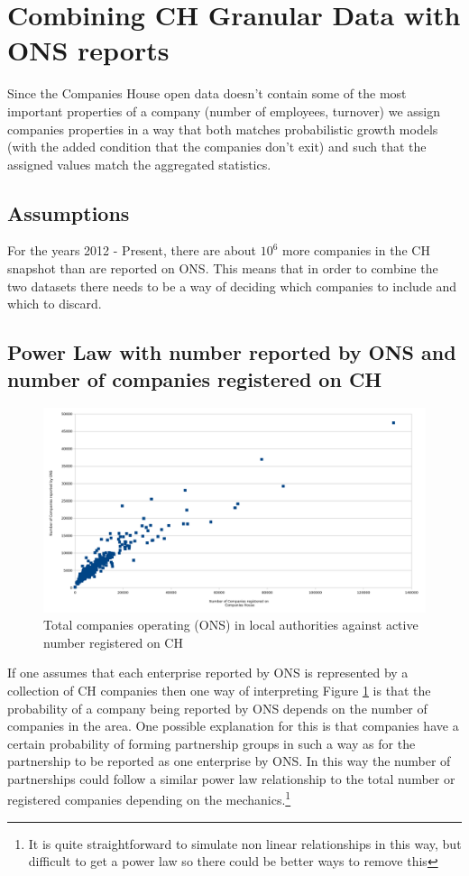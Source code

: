 \documentclass[a4paper,10pt]{article}
\begin{document}
\section{Combining CH Granular Data with ONS reports}
Since the Companies House open data doesn't contain some of the most important properties of a company (number of employees, turnover) we assign companies properties in a way that both matches probabilistic growth models (with the added condition that the companies don't exit) and such that the assigned values match the aggregated statistics.
\subsection{Assumptions}


For the years 2012 - Present, there are about $10^6$ more companies in the CH snapshot than are reported on ONS. This means that in order to combine the two datasets there needs to be a way of deciding which companies to include and which to discard.
\subsection{Power Law with number reported by ONS and number of companies registered on CH}
\begin{figure}[ht]
\includegraphics[width=\textwidth]{graphics/2017_ons_against_ch}
\caption{Total companies operating (ONS) in local authorities against active number registered on CH}
\label{ONS against CH}
\end{figure}
If one assumes that each enterprise reported by ONS is represented by a collection of CH companies then one way of interpreting Figure \ref{ONS against CH} is that the probability of a company being reported by ONS depends on the number of companies in the area. One possible explanation for this is that companies have a certain probability of forming partnership groups in such a way as for the partnership to be reported as one enterprise by ONS. In this way the number of partnerships could follow a similar power law relationship to the total number or registered companies depending on the mechanics.\footnote{It is quite straightforward to simulate non linear relationships in this way, but difficult to get a power law so there could be better ways to remove this}
\end{document}
